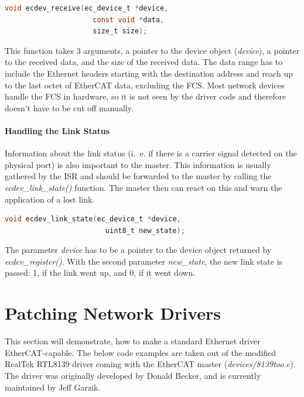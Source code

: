 \documentclass[a4paper,12pt,BCOR6mm,bibtotoc,idxtotoc]{scrbook}
\begin{document}
\begin{lstlisting}[gobble=2,language=C]
  void ecdev_receive(ec_device_t *device,
                     const void *data,
                     size_t size);
\end{lstlisting}

This function takes 3 arguments, a pointer to the device object
(\textit{device}), a pointer to the received data, and the size of the
received data. The data range has to include the Ethernet headers
starting with the destination address and reach up to the last octet
of EtherCAT data, excluding the FCS. Most network devices handle the
FCS in hardware, so it is not seen by the driver code and therefore
doesn't have to be cut off manually.

\paragraph{Handling the Link Status}

Information about the link status (i.~e. if there is a carrier signal detected
on the physical port) is also important to the master. This information is
usually gathered by the ISR and should be forwarded to the master by calling
the \textit{ecdev\_link\_state()} function. The master then can react on this
and warn the application of a lost link.

\begin{lstlisting}[gobble=2,language=C]
  void ecdev_link_state(ec_device_t *device,
                        uint8_t new_state);
\end{lstlisting}

The parameter \textit{device} has to be a pointer to the device object
returned by \textit{ecdev\_\-register()}. With the second parameter
\textit{new\_state}, the new link state is passed: 1, if the link went
up, and 0, if it went down.


\section{Patching Network Drivers}
\label{sec:patching}

This section will demonstrate, how to make a standard Ethernet driver
EtherCAT-capable. The below code examples are taken out of the
modified RealTek RTL8139 driver coming with the EtherCAT master
(\textit{devices/8139too.c}). The driver was originally developed by
Donald Becker, and is currently maintained by Jeff Garzik.
\end{document}
